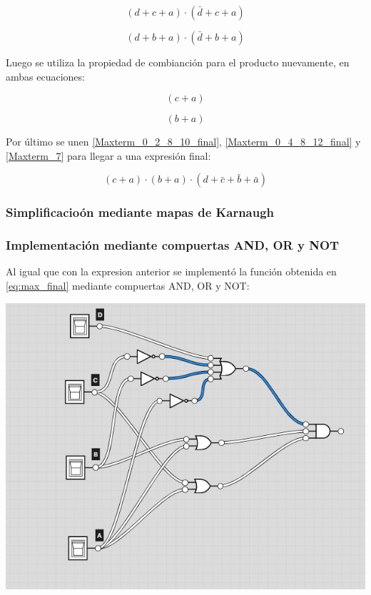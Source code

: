 \begin{equation}\label{Maxterm_0_2_8_10_simp}
(d + c + a) \cdot (\bar{d} + c + a) 
\end{equation}

\begin{equation}\label{Maxterm_0_4_8_12_simp}
(d + b +a) \cdot (\bar{d} + b + a)
\end{equation}

Luego se utiliza la propiedad de combianción para el producto nuevamente, en ambas ecuaciones:

\begin{equation}\label{Maxterm_0_2_8_10_final}
(c + a) 
\end{equation}

\begin{equation}\label{Maxterm_0_4_8_12_final}
(b +a)
\end{equation}

Por último se unen \ref{Maxterm_0_2_8_10_final}, \ref{Maxterm_0_4_8_12_final} y \ref{Maxterm_7} para llegar a una expresión final:

\begin{equation}\label{eq:max_final}
\boxed{(c + a) \cdot (b +a) \cdot (d + \bar{c} + \bar{b} + \bar{a})}
\end{equation}

\subsubsection{Simplificacioón mediante mapas de Karnaugh}


\subsubsection{Implementación mediante compuertas AND, OR y NOT}

Al igual que con la expresion anterior se implementó la función obtenida en \ref{eq:max_final} mediante compuertas AND, OR y NOT:

\includegraphics{Ejercicio_2/circuitos/Ej2_parte2_logily.png}


